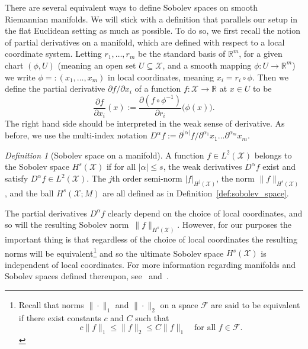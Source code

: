 \documentclass[aos]{imsart}
\theoremstyle{plain}
\theoremstyle{definition}
\theoremstyle{remark}
\newtheorem{definition}{Definition}
\def\R{\mathbb{R}}
\newcommand{\mc}[1]{\mathcal{#1}}
\newcommand{\Reals}{\mathbb{R}} %
\newcommand{\1}{\mathbf{1}}
\begin{document}
There are several equivalent ways to define Sobolev spaces on smooth Riemannian manifolds. We will stick with a definition that parallels our setup in the flat Euclidean setting as much as possible. To do so, we first recall the notion of partial derivatives on a manifold, which are defined with respect to a local coordinate system. Letting $r_1,\ldots,r_m$ be the standard basis of $\Reals^m$, for a given chart $(\phi,U)$ (meaning an open set $U \subseteq \mc{X}$, and a smooth mapping $\phi: U \to \Reals^m$) we write $\phi =: (x_1,\ldots,x_m)$ in local coordinates, meaning $x_i = r_i \circ \phi$. Then we define the partial derivative $\partial f/\partial x_i$ of a function $f: \mc{X} \to \Reals$ at $x \in U$ to be
\begin{equation*}
\frac{\partial f}{\partial x_i}(x) := \frac{\partial(f \circ \phi^{-1})}{\partial r_i}\bigl(\phi(x)\bigr).
\end{equation*}
The right hand side should be interpreted in the weak sense of derivative. As before, we use the multi-index notation $D^{\alpha}f := \partial^{|\alpha|}f/\partial^{\alpha_1}x_1\ldots\partial^{\alpha_m}x_m$. 

\begin{definition}[Sobolev space on a manifold]
	\label{def:sobolev_space_manifold}
	A function $f \in L^2(\mc{X})$ belongs to the Sobolev space $H^{s}(\mc{X})$ if for all $|\alpha| \leq s$, the weak derivatives $D^{\alpha}f$ exist and satisfy  $D^{\alpha}f \in L^2(\mc{X})$. The $j$th order semi-norm $|f|_{H^j(\mc{X})}$, the norm $\|f\|_{H^s(\mc{X})}$, and the ball $H^s(\mc{X};M)$ are all defined as in Definition~\ref{def:sobolev_space}.
\end{definition}
The partial derivatives $D^{\alpha}f$ clearly depend on the choice of local coordinates, and so will the resulting Sobolev norm~$\|f\|_{H^s(\mc{X})}$. However, for our purposes the important thing is that regardless of the choice of local coordinates the resulting norms will be equivalent\footnote{Recall that norms $\|\cdot\|_1$ and $\|\cdot\|_2$ on a space $\mc{F}$ are said to be equivalent if there exist constants $c$ and $C$ such that
	\begin{equation*}
	c \|f\|_1 \leq \|f\|_2 \leq C \|f\|_1 \quad \textrm{for all $f \in \mc{F}$.}
	\end{equation*}} 
and so the ultimate Sobolev space $H^s(\mc{X})$ is independent of local coordinates. For more information regarding manifolds and Sobolev spaces defined thereupon, see~\cite{lee2013} and~\cite{hebey1996}.
\end{document}
